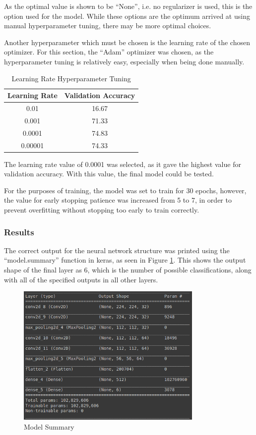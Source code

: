 As the optimal value is shown to be ``None'', i.e. no regularizer is used, this
is the option used for the model. While these options are the optimum arrived at
using manual hyperparameter tuning, there may be more optimal choices.

Another hyperparameter which must be chosen is the learning rate of the chosen
optimizer. For this section, the ``Adam'' optimizer was chosen, as the
hyperparameter tuning is relatively easy, especially when being done manually.

\begin{table}[H]
	\centering
	\caption{Learning Rate Hyperparameter Tuning}
	\label{tab:lrhyp}
	\begin{tabular}{|c|c|}
	\hline
	Learning Rate & Validation Accuracy \\
	\hline
	0.01 & 16.67 \\
	0.001 & 71.33 \\
	0.0001 & 74.83 \\
	0.00001 & 74.33 \\
	\hline
	\end{tabular}
\end{table}

The learning rate value of 0.0001 was selected, as it gave the highest value for
validation accuracy. With this value, the final model could be tested.

For the purposes of training, the model was set to train for 30 epochs, however,
the value for early stopping patience was increased from 5 to 7, in order to
prevent overfitting without stopping too early to train correctly.

\subsubsection{Results}

The correct output for the neural network structure was printed using the
``model.summary'' function in keras, as seen in Figure \ref{fig:q1paModSum}.
This shows the output shape of the final layer as 6, which is the number of
possible classifications, along with all of the specified outputs in all other
layers.

\begin{figure}[H]
	\centering
	\includegraphics[width=0.8\textwidth]{images/q1/pa/q1pamodel}
	\caption{Model Summary}
	\label{fig:q1paModSum}
\end{figure}

